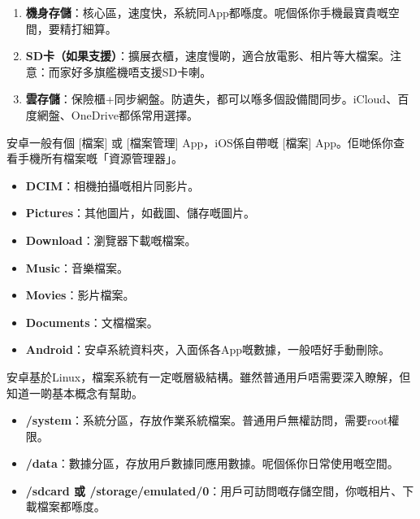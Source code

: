 


\begin{enumerate}
  \item \textbf{機身存儲}：核心區，速度快，系統同App都喺度。呢個係你手機最寶貴嘅空間，要精打細算。
  \item \textbf{SD卡（如果支援）}：擴展衣櫃，速度慢啲，適合放電影、相片等大檔案。注意：而家好多旗艦機唔支援SD卡喇。
  \item \textbf{雲存儲}：保險櫃+同步網盤。防遺失，都可以喺多個設備間同步。iCloud、百度網盤、OneDrive都係常用選擇。
\end{enumerate}


安卓一般有個 [檔案] 或 [檔案管理] App，iOS係自帶嘅 [檔案] App。佢哋係你查看手機所有檔案嘅「資源管理器」。


\begin{itemize}
  \item \textbf{DCIM}：相機拍攝嘅相片同影片。
  \item \textbf{Pictures}：其他圖片，如截圖、儲存嘅圖片。
  \item \textbf{Download}：瀏覽器下載嘅檔案。
  \item \textbf{Music}：音樂檔案。
  \item \textbf{Movies}：影片檔案。
  \item \textbf{Documents}：文檔檔案。
  \item \textbf{Android}：安卓系統資料夾，入面係各App嘅數據，一般唔好手動刪除。
\end{itemize}


安卓基於Linux，檔案系統有一定嘅層級結構。雖然普通用戶唔需要深入瞭解，但知道一啲基本概念有幫助。


\begin{itemize}
  \item \textbf{/system}：系統分區，存放作業系統檔案。普通用戶無權訪問，需要root權限。
  \item \textbf{/data}：數據分區，存放用戶數據同應用數據。呢個係你日常使用嘅空間。
  \item \textbf{/sdcard 或 /storage/emulated/0}：用戶可訪問嘅存儲空間，你嘅相片、下載檔案都喺度。
\end{itemize}

